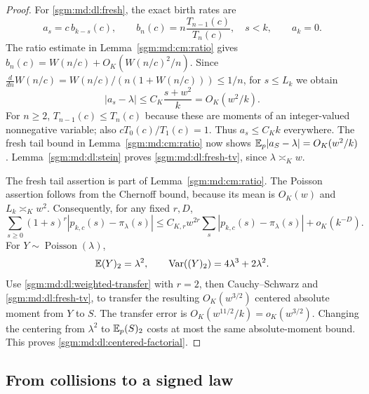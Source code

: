 \documentclass[11pt,letterpaper]{article}
\theoremstyle{remark}\newtheorem{remark}[theorem]{Remark}
\newcommand{\Poi}{\operatorname{Poisson}}\newcommand{\Bin}{\operatorname{Bin}}
\newcommand{\fall}[2]{(#1)_{#2}}\newcommand{\rise}[2]{#1^{\overline{#2}}}
\theoremstyle{definition}\newtheorem{definition}[theorem]{Definition}
\begin{document}
\begin{proof}
For \eqref{sgm:md:dl:fresh}, the exact birth rates are
\[
 a_s=c\,b_{k-s}(c),\qquad
 b_n(c)=n\frac{T_{n-1}(c)}{T_n(c)},\quad s<k,
 \qquad a_k=0.
\]
The ratio estimate in Lemma~\ref{sgm:md:cm:ratio} gives
$b_n(c)=W(n/c)+O_K(W(n/c)^2/n)$.
Since $\frac{d}{dn}W(n/c)=W(n/c)/(n(1+W(n/c)))\le1/n$,
for $s\le L_k$ we obtain
\[
 |a_s-\lambda|\le C_K\frac{s+w^2}{k}
                         =O_K(w^2/k).
\]
For $n\ge2$, $T_{n-1}(c)\le T_n(c)$ because these are moments of an
integer-valued nonnegative variable; also $cT_0(c)/T_1(c)=1$.
Thus $a_s\le C_Kk$ everywhere.  The fresh tail bound in
Lemma~\ref{sgm:md:cm:ratio} now shows
$\mathbb E_p|a_S-\lambda|=O_K(w^2/k)$.
Lemma~\ref{sgm:md:dl:stein} proves \eqref{sgm:md:dl:fresh-tv}, since
$\lambda\asymp_K w$.

The fresh tail assertion is part of Lemma~\ref{sgm:md:cm:ratio}.
The Poisson assertion follows from the Chernoff bound, because its mean
is $O_K(w)$ and $L_k\asymp_K w^2$.
Consequently, for any fixed $r,D$,
\begin{equation}\label{sgm:md:dl:weighted-transfer}
 \sum_{s\ge0}(1+s)^r|p_{k,c}(s)-\pi_\lambda(s)|
 \le C_{K,r}w^{2r}\sum_s|p_{k,c}(s)-\pi_\lambda(s)|+o_K(k^{-D}).
\end{equation}
For $Y\sim\Poi(\lambda)$,
\[
 \E\fall{Y}{2}=\lambda^2,
 \qquad
 \operatorname{Var}\!\left(\fall{Y}{2}\right)
                         =4\lambda^3+2\lambda^2.
\]
Use \eqref{sgm:md:dl:weighted-transfer} with $r=2$, then Cauchy--Schwarz and
\eqref{sgm:md:dl:fresh-tv}, to transfer the resulting $O_K(w^{3/2})$
centered absolute moment from $Y$ to $S$.
The transfer error is $O_K(w^{11/2}/k)=o_K(w^{3/2})$.
Changing the centering from $\lambda^2$ to
$\E_p\fall{S}{2}$ costs at most the same absolute-moment bound.
This proves \eqref{sgm:md:dl:centered-factorial}.
\end{proof}

\subsection{From collisions to a signed law}
\end{document}
